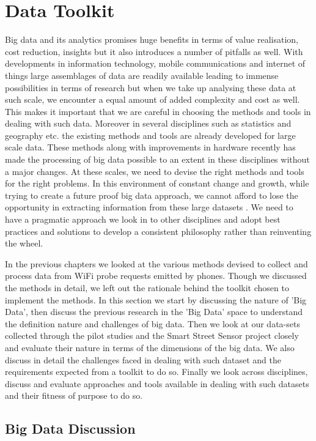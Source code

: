 \section{Data Toolkit}

Big data and its analytics promises huge benefits in terms of value realisation, cost reduction, insights but it also introduces a number of pitfalls as well.
With developments in information technology, mobile communications and internet of things large assemblages of data are readily available leading to immense possibilities in terms of research but when we take up analysing these data at such scale, we encounter a equal amount of added complexity and cost as well.
This makes it important that we are careful in choosing the methods and tools in dealing with such data.
Moreover in several disciplines such as statistics and geography etc. the existing methods and tools are already developed for large scale data.
These methods along with improvements in hardware recently has made the processing of big data possible to an extent in these disciplines without a major changes.
At these scales, we need to devise the right methods and tools for the right problems.
In this environment of constant change and growth, while trying to create a future proof big data approach, we cannot afford to lose the opportunity in extracting information from these large datasets .
We need to have a pragmatic approach we look in to other disciplines and adopt best practices and solutions to develop a consistent philosophy rather than reinventing the wheel.

In the previous chapters we looked at the various methods devised to collect and process data from WiFi probe requests emitted by phones.
Though we discussed the methods in detail, we left out the rationale behind the toolkit chosen to implement the methods.
In this section we start by discussing the nature of 'Big Data', then discuss the previous research in the 'Big Data' space to understand the definition nature and challenges of big data.
Then we look at our data-sets collected through the pilot studies and the Smart Street Sensor project closely and evaluate their nature in terms of the dimensions of the big data.
We also discuss in detail the challenges faced in dealing with such dataset and the requirements expected from a toolkit to do so.
Finally we look across disciplines, discuss and evaluate approaches and tools available in dealing with such datasets and their fitness of purpose to do so.

\subsection{Big Data Discussion}

